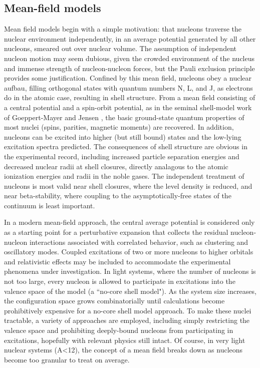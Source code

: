 \subsection{Mean-field models}
Mean field models begin with a simple motivation: that nucleons
traverse the nuclear environment independently, in an average
potential generated by all other nucleons, smeared out over nuclear volume.
The assumption of independent nucleon motion may seem dubious, given the
crowded environment of the nucleus and immense strength of nucleon-nucleon forces,
but the Pauli exclusion principle provides some justification.
Confined by this mean field, nucleons obey a nuclear aufbau, filling orthogonal states with
quantum numbers N, L, and J, as electrons do in the atomic case, resulting in
shell structure. From a mean field consisting of a central
potential and a spin-orbit potential, as in the seminal shell-model work of Goeppert-Mayer
and Jensen \cite{GoeppertMayer1955}, the basic ground-state quantum properties of most nuclei
(spins, parities, magnetic moments) are recovered. In addition, nucleons can be
excited into higher (but still bound) states and the low-lying excitation
spectra predicted. The consequences of shell structure are obvious
in the experimental record, including increased particle separation 
energies and decreased nuclear radii at shell closures, directly analagous to
the atomic ionization energies and radii in the noble gases. The independent
treatment of nucleons is most valid near shell closures,
where the level density is reduced, and near beta-stability, where coupling to
the asymptotically-free states of the continuum is least important.

In a modern mean-field approach, the central average potential is considered
only as a starting point for a perturbative
expansion that collects the residual nucleon-nucleon interactions associated with
correlated behavior, such as clustering and oscillatory modes. Coupled excitations of
two or more nucleons to higher orbitals and relativistic effects may be included to 
accommodate the experimental phenomena under investigation.
In light systems, where the number of nucleons is not too large, every nucleon is
allowed to participate in excitations into the valence space of the model
(a ``no-core shell model"). As the system size increases, the configuration space grows
combinatorially until calculations become prohibitively expensive for a no-core
shell model approach. To make these nuclei tractable, a variety of approaches
are employed, including simply restricting the valence space and prohibiting deeply-bound 
nucleons from participating in excitations, hopefully with relevant physics
still intact. Of course, in very light nuclear systems (A<12), the concept of a
mean field breaks down as nucleons become too granular to treat on average.

